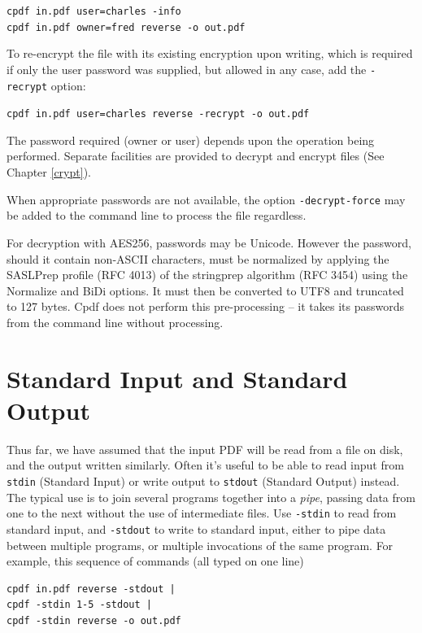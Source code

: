 \documentclass{book}
\begin{document}
\begin{framed}
\noindent\small\verb!cpdf in.pdf user=charles -info!\\
\noindent\small\verb!cpdf in.pdf owner=fred reverse -o out.pdf!
\end{framed}

\noindent To re-encrypt the file with its existing encryption upon writing, which is required if only the user password was supplied, but allowed in any case, add the \texttt{-recrypt} option:

\begin{framed}
\noindent\small\verb!cpdf in.pdf user=charles reverse -recrypt -o out.pdf!
\end{framed}

\noindent The password required (owner or user) depends upon the operation
being performed. Separate facilities are provided to decrypt and encrypt files
(See Chapter \ref{crypt}).

When appropriate passwords are not available, the option \texttt{-decrypt-force} may be added to the command line to process the file regardless.

For decryption with AES256, passwords may be Unicode. However the password, should it contain non-ASCII characters, must be normalized by applying the SASLPrep profile (RFC 4013) of the stringprep algorithm (RFC 3454) using the Normalize and BiDi options. It must then be converted to UTF8 and truncated to 127 bytes. Cpdf does not perform this pre-processing -- it takes its passwords from the command line without processing.

  \section{Standard Input and Standard Output}
 
  Thus far, we have assumed that the input PDF will be read from a file on
disk, and the output written similarly. Often it's useful to be able to read
input from \texttt{stdin} (Standard Input) or write output to \texttt{stdout}
(Standard Output) instead. The typical use is to join several programs
together into a \textit{pipe}, passing data from one to the next without the
use of intermediate files. Use \texttt{-stdin} to read from standard input, and
\texttt{-stdout} to write to standard input, either to pipe data between
multiple programs, or multiple invocations of the same program. For example, this sequence of commands (all typed on one line)

  \begin{framed}
  \noindent\small\begin{verbatim}
cpdf in.pdf reverse -stdout |
cpdf -stdin 1-5 -stdout |
cpdf -stdin reverse -o out.pdf\end{verbatim}
  \end{framed}
\end{document}
